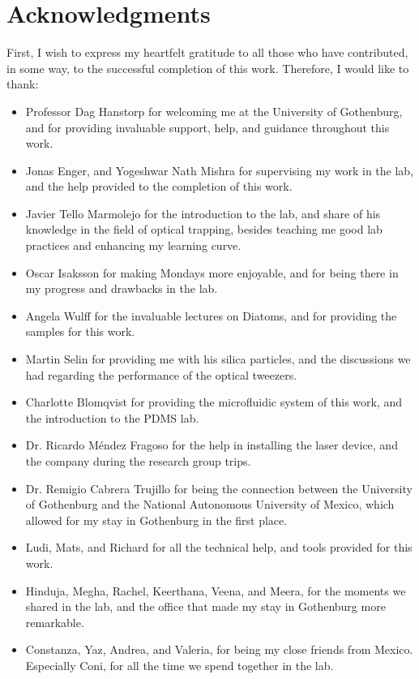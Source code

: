 \documentclass[letterpaper,12pt,oneside]{book}
\begin{document}
\chapter{Acknowledgments}
First, I wish to express my heartfelt gratitude to all those who have contributed, in some way, to the successful completion of this work. Therefore, I would like to thank:
\begin{itemize}
  \item Professor Dag Hanstorp for welcoming me at the University of Gothenburg, and for providing invaluable support, help, and guidance throughout this work. 
  \item Jonas Enger, and Yogeshwar Nath Mishra for supervising my work in the lab, and the help provided to the completion of this work. 
  \item Javier Tello Marmolejo for the introduction to the lab, and share of his knowledge in the field of optical trapping, besides teaching me good lab practices and enhancing my learning curve. 
  \item Oscar Isaksson for making Mondays more enjoyable, and for being there in my progress and drawbacks in the lab.
  \item Angela Wulff for the invaluable lectures on Diatoms, and for providing the samples for this work.
  \item Martin Selin for providing me with his silica particles, and the discussions we had regarding the performance of the optical tweezers.
 \item Charlotte Blomqvist for providing the microfluidic system of this work, and the introduction to the PDMS lab. 
  \item Dr. Ricardo Méndez Fragoso for the help in installing the laser device, and the company during the research group trips.
  \item Dr. Remigio Cabrera Trujillo for being the connection between the University of Gothenburg and the National Autonomous University of Mexico, which allowed for my stay in Gothenburg in the first place. 
  \item Ludi, Mats, and Richard for all the technical help, and tools provided for this work.
  \item Hinduja, Megha, Rachel,
Keerthana, Veena, and Meera, for the moments we shared in the lab, and the office that made my stay in Gothenburg more remarkable. 
\item Constanza, Yaz, Andrea, and Valeria, for being my close friends from Mexico. Especially Coni, for all the time we spend together in the lab.

\end{itemize}
\end{document}
